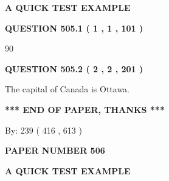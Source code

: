 \documentclass[12pt]{article}
\begin{document}
   
 \vspace{0.2in}
{\LARGE {\textbf{ A QUICK TEST EXAMPLE}}}
   
   
  
\vspace{0.2in}
  
{\textbf{\Large{QUESTION
505.1 
 ( 1 , 1 , 101 )
}}}
  
  
 
 
\noindent{}

90
 
 
  
\vspace{0.2in}
  
{\textbf{\Large{QUESTION
505.2 
 ( 2 , 2 , 201 )
}}}
  
  
 
 
\noindent{}
 
 
The capital of Canada is Ottawa.
 
 
 
 
   
   
 \vspace{0.2in}
 
   
   
   
   
\vspace{1.0in} 
{\textbf{\large{ *** END OF PAPER, THANKS *** }}} 
   
   
\hspace{1.0in} By: 
 239 ( 416 ,  613 )
   
   
   
   
\newpage 
\setcounter{page}{ 
   506001 } 
   
   
   
   
 {\textbf{ \Large{ PAPER NUMBER  506  }}}
   
   
\vspace{0.2in}
   
   
   
   
   
   
 \vspace{0.2in}
{\LARGE {\textbf{ A QUICK TEST EXAMPLE}}}
   
   
  
\vspace{0.2in}
  
\end{document}
